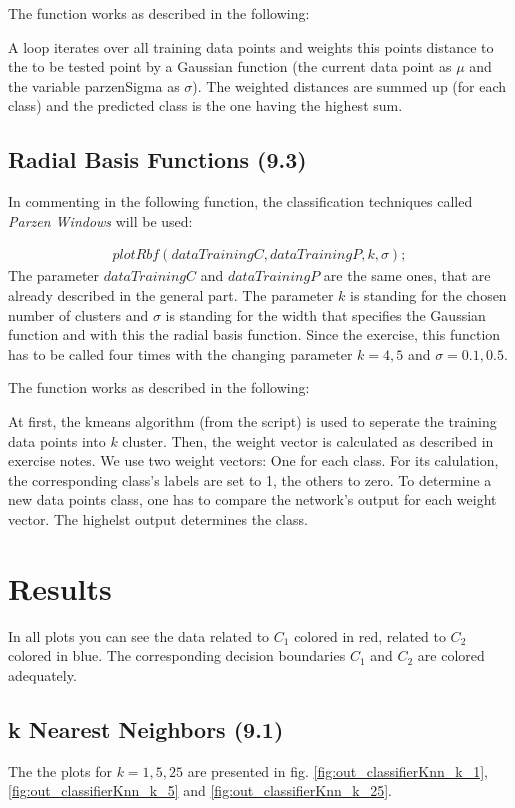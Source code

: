\documentclass[a4paper,headings=small]{scrartcl}
\begin{document}
The function works as described in the following:

A loop iterates over all training data points and weights this points distance
to the to be tested point by a Gaussian function
(the current data point as $\mu$ and the variable parzenSigma as $\sigma$).
The weighted distances are summed up (for each class) and the predicted class is the one having the highest sum.

\subsection{Radial Basis Functions (9.3)}
In commenting in the following function, the classification techniques called \emph{Parzen Windows} will be used:

\begin{align}
plotRbf(dataTrainingC, dataTrainingP, k, \sigma);
\end{align}
The parameter $dataTrainingC$ and $dataTrainingP$ are the same ones, that are already described in the general part.
The parameter $k$ is standing for the chosen number of clusters and $\sigma$ is standing for the width that specifies
the Gaussian function and with this the radial basis function.
Since the exercise, this function has to be called four times with the changing parameter $k = 4, 5$ and $\sigma = 0.1, 0.5$.

The function works as described in the following:

At first, the kmeans algorithm (from the script) is used to seperate the training data points into $k$ cluster.
Then, the weight vector is calculated as described in exercise notes.
We use two weight vectors:
One for each class. For its calulation, the corresponding class's labels are set to 1, the others to zero.
To determine a new data points class, one has to compare the network's output for each weight vector.
The highelst output determines the class.


\section{Results}

\newcommand{\classifierPlotWidth}[0]{0.85}

In all plots you can see the data related to $C_1$ colored in red, related to $C_2$ colored in blue.
The corresponding decision boundaries $C_1$ and $C_2$ are colored adequately.


\subsection{k Nearest Neighbors (9.1)}
The the plots for $k = 1, 5, 25$ are presented in fig.
\ref{fig:out_classifierKnn_k_1},
\ref{fig:out_classifierKnn_k_5} and
\ref{fig:out_classifierKnn_k_25}.
\end{document}

